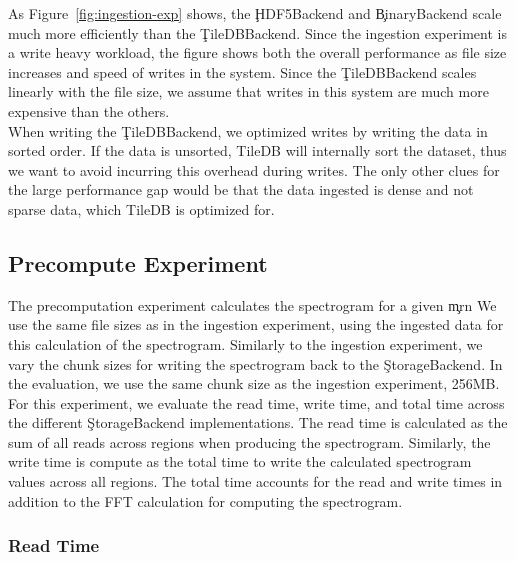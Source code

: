 As Figure~\ref{fig:ingestion-exp} shows, the \c{HDF5Backend} and
\c{BinaryBackend} scale much more efficiently than the \c{TileDBBackend}. Since
the ingestion experiment is a write heavy workload, the figure shows both the
overall performance as file size increases and speed of writes in the system.
Since the \c{TileDBBackend} scales linearly with the file size, we assume that writes
in this system are much more expensive than the others. \\

When writing the \c{TileDBBackend}, we optimized writes by writing the data in
sorted order. If the data is unsorted, TileDB will internally sort the dataset,
thus we want to avoid incurring this overhead during writes. The only other
clues for the large performance gap would be that the data ingested is dense
and not sparse data, which TileDB is optimized for.

\subsection{Precompute Experiment}\label{storage-ch:precompute-exp}

The precomputation experiment calculates the spectrogram for a given \c{mrn} We
use the same file sizes as in the ingestion experiment, using the ingested data
for this calculation of the spectrogram. Similarly to the ingestion experiment,
we vary the chunk sizes for writing the spectrogram back to the
\c{StorageBackend}. In the evaluation, we use the same chunk size as the
ingestion experiment, 256MB. \\

For this experiment, we evaluate the read time, write time, and total time
across the different \c{StorageBackend} implementations. The read time is
calculated as the sum of all reads across regions when producing the
spectrogram. Similarly, the write time is compute as the total time to write
the calculated spectrogram values across all regions. The total time accounts
for the read and write times in addition to the FFT calculation for computing
the spectrogram.

\subsubsection{Read Time}

